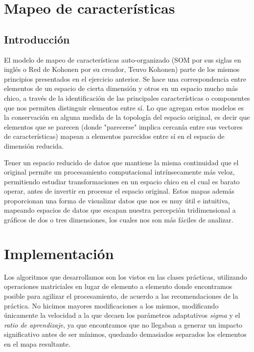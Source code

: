 \section{Mapeo de características}

\subsection{Introducción}

El modelo de mapeo de características auto-organizado (SOM por sus siglas en inglés o Red de Kohonen por su creador, Teuvo Kohonen) parte de los mismos principios presentados en el ejercicio anterior. Se hace una correspondencia entre elementos de un espacio de cierta dimensión y otros en un espacio mucho más chico, a través de la identificación de las principales características o componentes que nos permiten distinguir elementos entre sí. Lo que agregan estos modelos es la conservación en alguna medida de la topología del espacio original, es decir que elementos que se parecen (donde "parecerse" implica cercanía entre sus vectores de características) mapean a elementos parecidos entre sí en el espacio de dimensión reducida.

Tener un espacio reducido de datos que mantiene la misma continuidad que el original permite un procesamiento computacional intrínsecamente más veloz, permitiendo estudiar transformaciones en un espacio chico  en el cual es barato operar, antes de invertir en procesar el espacio original. Estos mapas además proporcionan una forma de visualizar datos que nos es muy útil e intuitiva, mapeando espacios de datos que escapan nuestra percepción tridimensional a gráficos de dos o tres dimensiones, los cuales nos son más fáciles de analizar. 

\section{Implementación}

Los algoritmos que desarrollamos son los vistos en las clases prácticas, utilizando operaciones matriciales en lugar de elemento a elemento donde encontramos posible para agilizar el procesamiento, de acuerdo a las recomendaciones de la práctica. No hicimos mayores modificaciones a los mismos, modificando únicamente la velocidad a la que decaen los parámetros adaptativos \textit{sigma} y el \textit{ratio de aprendizaje}, ya que encontramos que no llegaban a generar un impacto significativo antes de ser mínimos, quedando demasiados separados los elementos en el mapa resultante.


